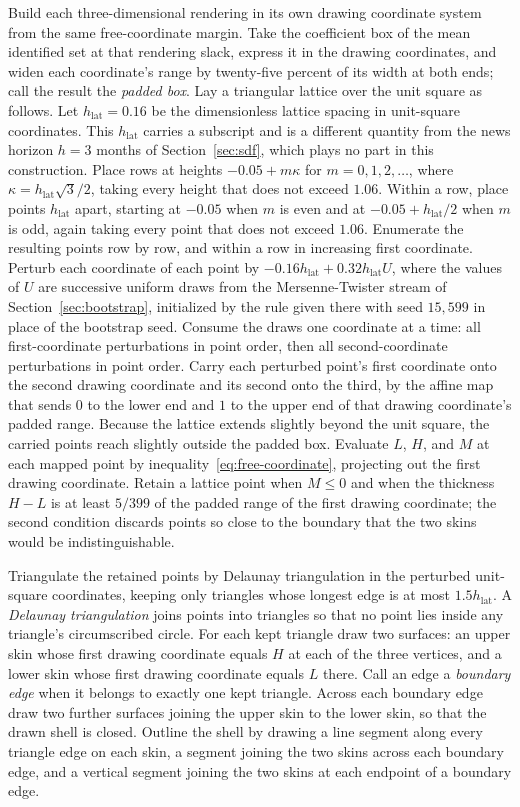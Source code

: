 \documentclass[11pt]{article}
\begin{document}
Build each three-dimensional rendering in its own drawing coordinate system from the same
free-coordinate margin. Take the coefficient box of the mean identified set at that rendering slack,
express it in the drawing coordinates, and widen each coordinate's range by twenty-five percent of
its width at both ends; call the result the \emph{padded box}. Lay a triangular lattice over the unit
square as follows. Let \(h_{\mathrm{lat}}=0.16\) be the dimensionless lattice spacing in unit-square
coordinates. This \(h_{\mathrm{lat}}\) carries a subscript and is a different quantity from the news
horizon \(h=3\) months of Section~\ref{sec:sdf}, which plays no part in this construction. Place
rows at heights \(-0.05+m\kappa\) for \(m=0,1,2,\ldots\), where
\(\kappa=h_{\mathrm{lat}}\sqrt3/2\), taking every height that does not exceed
\(1.06\). Within a row, place points \(h_{\mathrm{lat}}\) apart, starting at \(-0.05\) when \(m\) is
even and at \(-0.05+h_{\mathrm{lat}}/2\) when \(m\) is odd, again taking every point that does not
exceed \(1.06\).
Enumerate the resulting points row by row, and within a row in increasing first coordinate. Perturb
each coordinate of each point by \(-0.16h_{\mathrm{lat}}+0.32h_{\mathrm{lat}}U\), where the values of
\(U\) are successive uniform
draws from the Mersenne-Twister stream of Section~\ref{sec:bootstrap}, initialized by the rule given
there with seed \(15{,}599\) in place of the bootstrap seed. Consume the draws one coordinate at a
time: all first-coordinate perturbations in point order, then all second-coordinate perturbations in
point order. Carry each perturbed point's first coordinate onto the second drawing coordinate and its
second onto the third, by the affine map that sends \(0\) to the lower end and \(1\) to the upper end
of that drawing coordinate's padded range. Because the lattice extends slightly beyond the unit
square, the carried points reach slightly outside the padded box. Evaluate \(L\), \(H\),
and \(M\) at each mapped point by inequality~\eqref{eq:free-coordinate}, projecting out the first
drawing coordinate. Retain a lattice point when \(M\le0\) and when the thickness \(H-L\) is at least
\(5/399\) of the padded range of the first drawing coordinate; the second condition discards points
so close to the boundary that the two skins would be indistinguishable.

Triangulate the retained points by Delaunay triangulation in the perturbed unit-square coordinates,
keeping only triangles whose longest edge is at most \(1.5h_{\mathrm{lat}}\). A \emph{Delaunay triangulation} joins
points into triangles so that no point lies inside any triangle's circumscribed circle. For each kept
triangle draw two surfaces: an upper skin whose first drawing coordinate equals \(H\) at each of the
three vertices, and a lower skin whose first drawing coordinate equals \(L\) there. Call an edge a
\emph{boundary edge} when it belongs to exactly one kept triangle. Across each boundary edge draw two
further surfaces joining the upper skin to the lower skin, so that the drawn shell is closed. Outline
the shell by drawing a line segment along every triangle edge on each skin, a segment joining the two
skins across each boundary edge, and a vertical segment joining the two skins at each endpoint of a
boundary edge.
\end{document}
